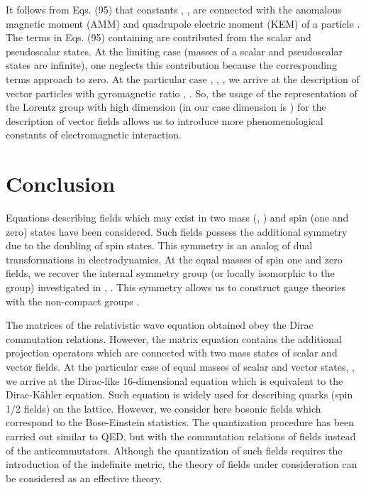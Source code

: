 \documentclass[a4paper,12pt]{article}
\begin{document}
It follows from Eqs. (95) that constants \coordHE{}, \coordHE{},
\coordHE{} are connected with the anomalous magnetic moment (AMM)
and quadrupole electric moment (KEM) of a particle \cite{Joung}.
The terms in Eqs. (95) containing \coordHE{} are contributed from the
scalar and pseudoscalar states. At the limiting case
\coordHE{} (masses of a scalar and pseudoscalar states
are infinite), one neglects this contribution because the
corresponding terms approach to zero. At the particular case
\coordHE{}, \coordHE{}, \coordHE{}, we arrive at
the description of vector particles with gyromagnetic ratio \coordHE{}
\cite{Durand}, \cite{monogr}. So, the usage of the representation
of the Lorentz group with high dimension (in our case dimension is
\coordHE{}) for the description of vector fields allows us to introduce
more phenomenological constants of electromagnetic interaction.

\section{Conclusion}

Equations describing fields which may exist in two mass (\coordHE{},
\coordHE{}) and spin (one and zero) states have been considered. Such
fields possess the additional symmetry due to the doubling of spin
states. This symmetry is an analog of dual transformations in
electrodynamics. At the equal masses of spin one and zero fields,
we recover the internal symmetry group \coordHE{} (or locally
isomorphic to the \coordHE{} group) investigated in \cite{Kruglov1},
\cite{monogr}. This symmetry allows us to construct gauge theories
with the non-compact groups \cite{monogr}.

The matrices of the relativistic wave equation obtained obey the
Dirac commutation relations. However, the matrix equation contains
the additional projection operators which are connected with two
mass states of scalar and vector fields. At the particular case of
equal masses of scalar and vector states, \coordHE{}, we arrive at
the Dirac-like 16-dimensional equation which is equivalent to the
Dirac-K\"{a}hler equation. Such equation is widely used for
describing quarks (spin 1/2 fields) on the lattice. However, we
consider here bosonic fields which correspond to the Bose-Einstein
statistics. The quantization procedure has been carried out
similar to QED, but with the commutation relations of fields
instead of the anticommutators. Although the quantization of such
fields requires the introduction of the indefinite metric, the
theory of fields under consideration can be considered as an
effective theory.
\end{document}

